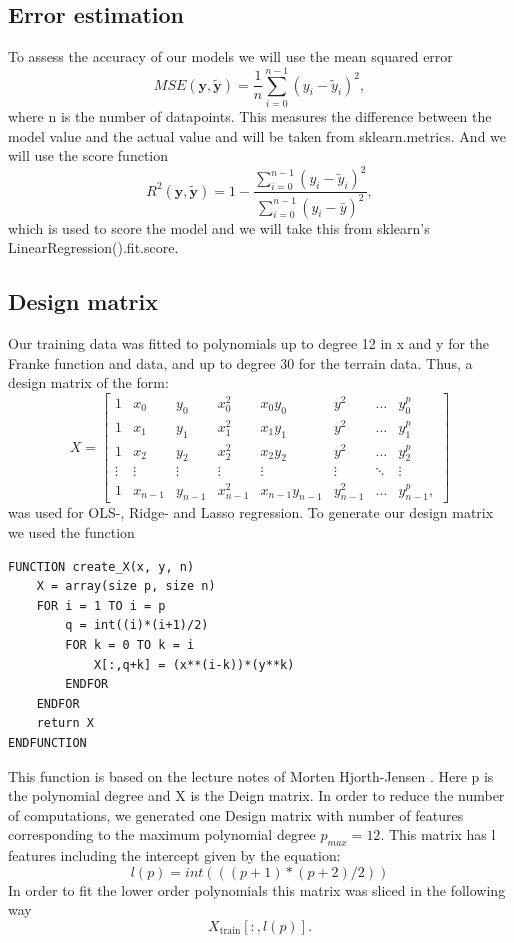 \subsection{Error estimation}
To assess the accuracy of our models we will use the mean squared error
$$
MSE(\boldsymbol{y},\tilde{\boldsymbol{y}}) = \frac{1}{n}
\sum_{i=0}^{n-1}(y_i-\tilde{y}_i)^2,
$$
where n is the number of datapoints. This measures the difference between the model value and the actual value and will be taken from sklearn.metrics. And we will use the score function
$$
R^2(\boldsymbol{y}, \tilde{\boldsymbol{y}}) = 1 - \frac{\sum_{i=0}^{n - 1} (y_i - \tilde{y}_i)^2}{\sum_{i=0}^{n - 1} (y_i - \bar{y})^2},
$$
which is used to score the model and we will take this from sklearn's LinearRegression().fit.score.

\subsection{Design matrix} \label{sec:design_matrix} 

Our training data was fitted to polynomials up
to degree 12 in x and y for the Franke function and data, and up to degree 30
for the terrain data. Thus, a design matrix of the form:
\begin{equation*}
    X = 
    \begin{bmatrix}

        1 & x_{0} & y_0 & x_{0}^{2} & x_0 y_0 & y^2 & \dots &y_{0}^{p} \\
        1 & x_{1} & y_1 & x_{1}^{2} & x_1 y_1 & y^2 & \dots &y_{1}^{p} \\
        1 & x_{2} & y_2 & x_{2}^{2} & x_2 y_2 & y^2 & \dots &y_{2}^{p} \\
        \vdots &\vdots &\vdots &\vdots &\vdots & \vdots & \ddots & \vdots \\
        1&x_{n-1} & y_{n-1} & x_{n-1}^2 & x_{n-1} y_{n-1} & y_{n-1}^2 & \dots &y_{n-1}^{p}, 
    \end{bmatrix}
\end{equation*}
was used for OLS-, Ridge- and Lasso regression. To generate our design matrix we used the function
\begin{lstlisting}
FUNCTION create_X(x, y, n)
	X = array(size p, size n)
	FOR i = 1 TO i = p
		q = int((i)*(i+1)/2)
		FOR k = 0 TO k = i
			X[:,q+k] = (x**(i-k))*(y**k)
		ENDFOR
	ENDFOR
	return X
ENDFUNCTION
\end{lstlisting}
This function is based on the lecture notes of Morten Hjorth-Jensen \cite{w35}.
Here p is the polynomial degree and X is the Deign matrix. 
In order to reduce the number of computations, we generated one Design matrix
with number of features corresponding to the maximum polynomial degree $p_{max}
= 12$. This matrix has l features including the intercept given by the
equation: 
\begin{equation}
        \label{eq:l_features} 
        l(p) = int(((p+1)*(p+2)/2))		
\end{equation}
In order to fit the lower order polynomials this matrix was sliced in the
following way
\begin{equation*}
    X_{\text{train}}[:,l(p)].
\end{equation*}

